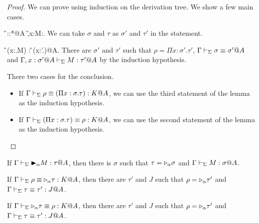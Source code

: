\begin{proof}
    We can prove using induction on the derivation tree.
    We show a few main cases.

    \begin{rneqncase}{\TAbs{}}{
            \G\V \sigma::*@A  \G,x:\sigma@A\V M:\tau@A.
            }
            We can take $\sigma$ and $\tau$ as $\sigma'$ and $\tau'$ in the statement.
    \end{rneqncase}

    \begin{rneqncase}{\TConv{}}{
            \G \V (\lambda x:\sigma.M) : \rho@A {} \G \V \rho \E (\Pi x:\sigma'.\tau)@A.
            }
            There are $\sigma'$ and $\tau'$ such that
            $\rho = \Pi x:\sigma'.\tau'$, $\Gamma \vdash_\Sigma \sigma \equiv \sigma'@A$ and $\Gamma ,x:\sigma'@A\vdash_\Sigma M:\tau'@A$
            by the induction hypothesis.
    \end{rneqncase}

    \begin{rneqncase}{\QTRefl{}}{}
        There two cases for the conclusion.
        \begin{itemize}
            \item If $\Gamma \vdash_\Sigma \rho \equiv (\Pi x:\sigma.\tau) : K @A$,
                we can use the third statement of the lemma as the induction hypothesis.
            \item If $\Gamma \vdash_\Sigma (\Pi x:\sigma.\tau) \equiv \rho : K @A$,
                we can use the second statement of the lemma as the induction hypothesis.
        \end{itemize}
    \end{rneqncase}

\end{proof}

\begin{lemma}
    \label{lemma:InversionLemmaForTWType}
    \begin{item}
    \item If $\G \V \TB_\alpha M : \tau@A$, then
        there is $\sigma$ such that $\tau = {\mathop{\triangleright}}_\alpha \sigma$ and $\G \V M : \sigma@A$.
    \item If $\Gamma \vdash_\Sigma \rho \equiv {\mathop{\triangleright}}_\alpha \tau : K @A$, then there are $\tau'$ and $J$ such that
        $\rho = {\mathop{\triangleright}}_\alpha \tau'$ and $\Gamma \vdash_\Sigma \tau \equiv \tau' : J @A$.
    \item If $\Gamma \vdash_\Sigma {\mathop{\triangleright}}_\alpha \tau \equiv \rho : K @A$, then there are $\tau'$ and $J$ such that
        $\rho = {\mathop{\triangleright}}_\alpha \tau'$ and $\Gamma \vdash_\Sigma \tau \equiv \tau' : J @A$.
    \end{item}
\end{lemma}


